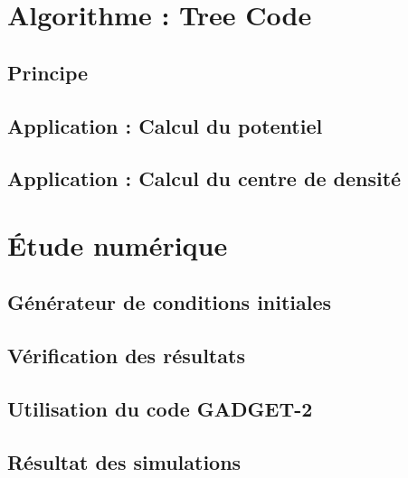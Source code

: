 \chapter{Algorithme : Tree Code}
	\minitoc
	\section{Principe}
		
	\section{Application : Calcul du potentiel}
		
	\section{Application : Calcul du centre de densité}
		
	\FloatBarrier

\chapter{Étude numérique}
	\minitoc
	\section{Générateur de conditions initiales}
		
	\section{Vérification des résultats\label{Verif_gene}} %
		
	\section{Utilisation du code \textsc{GADGET-2}}
		
	\section{Résultat des simulations}
		


